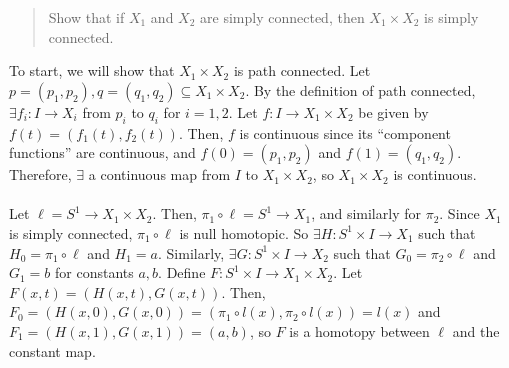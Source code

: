 \documentclass[10pt]{extarticle}
\title{}
\author{Avinash Iyer}
\date{}
\begin{document}
{
    \begin{quote}
      Show that if $X_1$ and $X_2$ are simply connected, then $X_1\times X_2$ is simply connected.
    \end{quote}
To start, we will show that $X_1\times X_2$ is path connected. Let $p = (p_1,p_2), q = (q_1,q_2)\subseteq X_1\times X_2$. By the definition of path connected, $\exists f_i:I\rightarrow X_i$ from $p_i$ to $q_i$ for $i = 1,2$. Let $f: I\rightarrow X_1\times X_2$ be given by $f(t) = (f_1(t),f_2(t))$. Then, $f$ is continuous since its ``component functions'' are continuous, and $f(0) = (p_1,p_2)$ and $f(1) = (q_1,q_2)$. Therefore, $\exists$ a continuous map from $I$ to $X_1\times X_2$, so $X_1\times X_2$ is continuous.\\
\\
Let $\ell = S^1 \rightarrow X_1\times X_2$. Then, $\pi_1\circ \ell = S^1\rightarrow X_1$, and similarly for $\pi_2$. Since $X_1$ is simply connected, $\pi_1\circ \ell$ is null homotopic. So $\exists H: S^1\times I \rightarrow X_1$ such that $H_0 = \pi_1\circ \ell$ and $H_1 = a$. Similarly, $\exists G: S^1\times I\rightarrow X_2$ such that $G_0 = \pi_2\circ \ell$ and $G_1 = b$ for constants $a,b$. Define $F: S^1\times I \rightarrow X_1 \times X_2$. Let $F(x,t) = (H(x,t),G(x,t))$. Then, $F_0 = (H(x,0),G(x,0)) = (\pi_1\circ l(x),\pi_2\circ l(x)) = l(x)$ and $F_1 = (H(x,1),G(x,1)) = (a,b)$, so $F$ is a homotopy between $\ell$ and the constant map.
}
\end{document}
